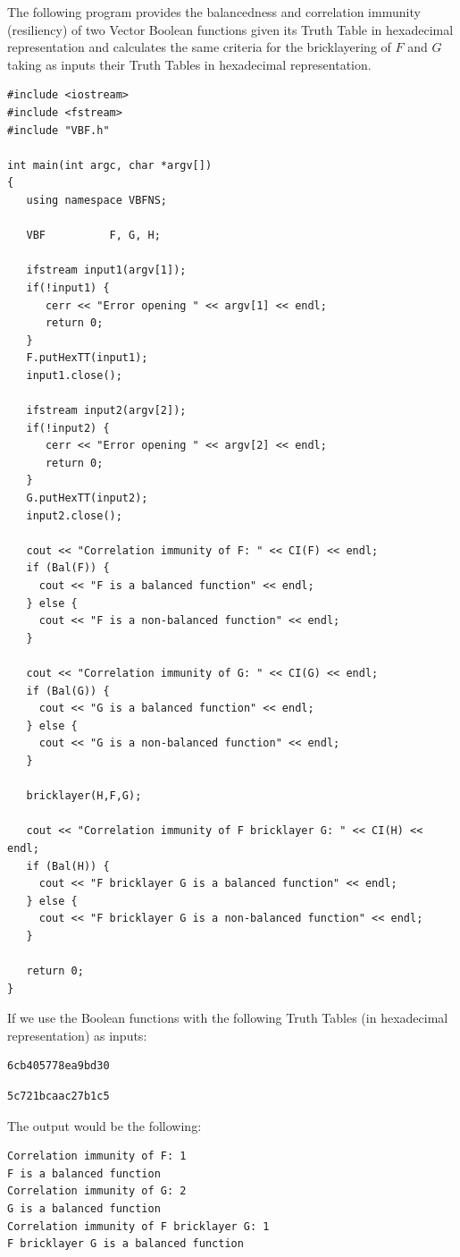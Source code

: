 \begin{example}
The following program provides the balancedness and correlation immunity (resiliency) of two Vector Boolean functions given its Truth Table in hexadecimal representation and calculates the same criteria for the bricklayering of $F$ and $G$ taking as inputs their Truth Tables in hexadecimal representation.

\begin{verbatim}
#include <iostream>
#include <fstream>
#include "VBF.h"

int main(int argc, char *argv[])
{
   using namespace VBFNS;

   VBF          F, G, H;

   ifstream input1(argv[1]);
   if(!input1) {
      cerr << "Error opening " << argv[1] << endl;
      return 0;
   }
   F.putHexTT(input1);
   input1.close();

   ifstream input2(argv[2]);
   if(!input2) {
      cerr << "Error opening " << argv[2] << endl;
      return 0;
   }
   G.putHexTT(input2);
   input2.close();

   cout << "Correlation immunity of F: " << CI(F) << endl;
   if (Bal(F)) {
     cout << "F is a balanced function" << endl;
   } else {
     cout << "F is a non-balanced function" << endl;
   }

   cout << "Correlation immunity of G: " << CI(G) << endl;
   if (Bal(G)) {
     cout << "G is a balanced function" << endl;
   } else {
     cout << "G is a non-balanced function" << endl;
   }

   bricklayer(H,F,G);

   cout << "Correlation immunity of F bricklayer G: " << CI(H) << endl;
   if (Bal(H)) {
     cout << "F bricklayer G is a balanced function" << endl;
   } else {
     cout << "F bricklayer G is a non-balanced function" << endl;
   }

   return 0;
}
\end{verbatim}

If we use the Boolean functions with the following Truth Tables (in hexadecimal representation) as inputs:

\begin{verbatim}
6cb405778ea9bd30
\end{verbatim}

\begin{verbatim}
5c721bcaac27b1c5
\end{verbatim}

The output would be the following:

\begin{verbatim}
Correlation immunity of F: 1
F is a balanced function
Correlation immunity of G: 2
G is a balanced function
Correlation immunity of F bricklayer G: 1
F bricklayer G is a balanced function
\end{verbatim}

\end{example}

